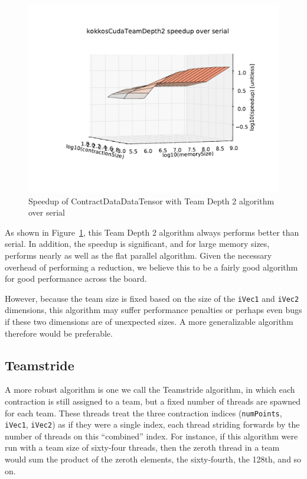 \begin{figure}[ht]
    \includegraphics[scale=.55]{./VersusSerial_kokkosCudaTeamDepth2_clearCache_shadowfax.pdf}
\caption{Speedup of ContractDataDataTensor with Team Depth 2 algorithm over
    serial
\label{fig:ContractDataDataTensorDepth2}} 
\end{figure}

As shown in Figure~\ref{fig:ContractDataDataTensorDepth2}, this Team Depth 2
algorithm always performs better than serial.  In addition, the speedup is
significant, and for large memory sizes, performs nearly as well as the flat
parallel algorithm.  Given the necessary overhead of performing a reduction, we
believe this to be a fairly good algorithm for good performance across the
board.

However, because the team size is fixed based on the size of the \texttt{iVec1}
and \texttt{iVec2} dimensions, this algorithm may suffer performance penalties
or perhaps even bugs if these two dimensions are of unexpected sizes.  A more
generalizable algorithm therefore would be preferable.

\subsection{Teamstride}
    A more robust algorithm is one we call the Teamstride algorithm, in which
    each contraction is still assigned to a team, but a fixed number of threads
    are spawned for each team.  These threads treat the three contraction
    indices (\texttt{numPoints}, \texttt{iVec1}, \texttt{iVec2}) as if they were
    a single index, each thread striding forwards by the number of threads on
    this ``combined'' index.  For instance, if this algorithm were run with a
    team size of sixty-four threads, then the zeroth thread in a team would sum
    the product of the zeroth elements, the sixty-fourth, the 128th, and so on.
    
